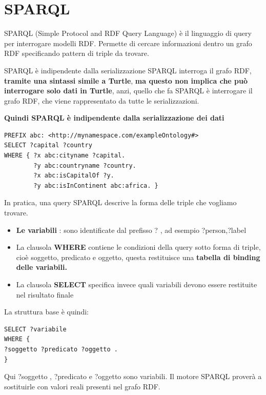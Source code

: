 \newpage
\section{SPARQL}
SPARQL (Simple Protocol and RDF Query Language) è il linguaggio di query per interrogare modelli RDF.
Permette di cercare informazioni dentro un grafo RDF specificando pattern di triple da
trovare.
\begin{warning}{SPARQL è indipendente dalla serializzazione}
    SPARQL interroga il grafo RDF, \textbf{tramite una sintassi simile a Turtle}, \textbf{ma questo non implica che può interrogare solo dati in Turtle},
    anzi, quello che fa SPARQL è interrogare il grafo RDF, che viene rappresentato da tutte le serializzazioni.

    
    \textbf{Quindi SPARQL è indipendente dalla serializzazione dei dati}
\end{warning}

\begin{lstlisting}[caption={Query SPARQL per capitali e paesi nel continente africano}]
PREFIX abc: <http://mynamespace.com/exampleOntology#>
SELECT ?capital ?country
WHERE { ?x abc:cityname ?capital.
        ?y abc:countryname ?country.
        ?x abc:isCapitalOf ?y.
        ?y abc:isInContinent abc:africa. }
\end{lstlisting}

In pratica, una query SPARQL descrive la forma delle triple che vogliamo trovare.
\begin{itemize}
    \item \textbf{Le variabili} : sono identificate dal prefisso ? , ad esempio ?person,?label
    \item La clausola \textbf{WHERE} contiene le condizioni della query sotto forma di triple, cioè soggetto,
predicato e oggetto, questa restituisce una \textbf{tabella di binding delle variabili.}
    \item La clausola \textbf{SELECT} specifica invece quali variabili devono essere restituite nel risultato
finale
\end{itemize}
La struttura base è quindi:
\begin{lstlisting}[caption={Struttura base di una query SPARQL}]
SELECT ?variabile
WHERE {
?soggetto ?predicato ?oggetto .
}
\end{lstlisting}
Qui ?soggetto , ?predicato e ?oggetto sono variabili. Il motore SPARQL proverà a sostituirle con valori reali presenti nel grafo RDF.
